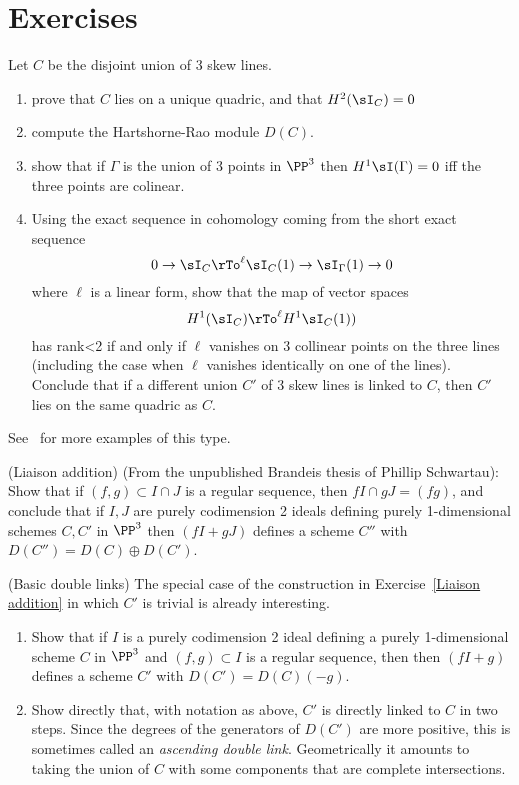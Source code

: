 \section{Exercises}
\begin{exercise}
Let $C$ be the disjoint union of 3 skew lines. 
\begin{enumerate}
 \item prove that $C$ lies on a unique quadric, and that $H^2(\sI_C) = 0$
 \item compute the Hartshorne-Rao module $D(C)$.
 \item show that if $\Gamma$ is the union of 3 points in $\PP^3$ then
 $H^1\sI(\Gamma) = 0$ iff the three points are colinear.
 \item Using the exact sequence in cohomology coming from the short exact sequence
$$
0\to \sI_C \rTo^{\ell} \sI_C(1) \to \sI_\Gamma(1) \to 0
$$
where $\ell$ is a linear form, show that the map of vector spaces
$$
H^1(\sI_C) \rTo^{\ell} H^1\sI_C(1))
$$
has rank<2 if and only if $\ell$ vanishes on 3 collinear points on the three lines (including the case when $\ell$ vanishes identically on one of the lines).
Conclude that if a different union $C'$ of 3 skew lines is linked to $C$, then $C'$ lies on the same quadric as $C$.
\end{enumerate}
See~\cite{Migliore} for more examples of this type.
\end{exercise}

\begin{exercise} (Liaison addition)\label{Liaison addition}
(From the unpublished Brandeis thesis of Phillip Schwartau): Show that if $(f, g)\subset I\cap J$ is a regular sequence,
 then $f I \cap gJ = (fg)$, and conclude that if $I,J$ are purely codimension 2 ideals
 defining purely 1-dimensional schemes $C,C'$ in $\PP^3$
 then  $(fI+gJ)$ defines a scheme $C''$ with $D(C'') = D(C) \oplus D(C')$.
\end{exercise}

\begin{exercise}(Basic double links)\label{Basic double links}
The special case of the construction in Exercise~\ref{Liaison addition} in which $C'$ is trivial is already interesting. 

\begin{enumerate}
 \item Show that if $I$ is a purely codimension 2 ideal
 defining a purely 1-dimensional scheme $C$ in $\PP^3$
 and $(f, g)\subset I$ is a regular sequence, then
 then  $(fI+g)$ defines a scheme $C'$ with $D(C') = D(C)(-g)$.

 \item Show directly that, with notation as above, $C'$ is directly linked to $C$
 in two steps. Since the degrees of the generators of $D(C')$ are more positive, this
 is sometimes called an \emph{ascending double link}. Geometrically it amounts to taking the
 union of $C$ with some  components that are complete intersections.
 \end{enumerate}

\end{exercise}

